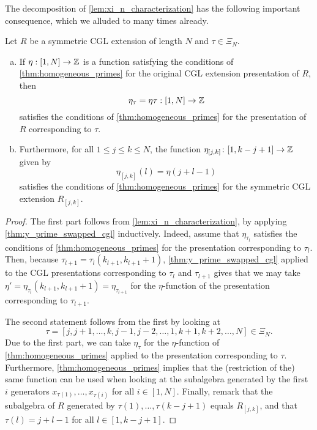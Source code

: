 The decomposition of \cref{lem:xi_n_characterization} has the following important
consequence, which we alluded to many times already.
\begin{proposition}\label{prop:eta_invariance}
	Let $R$ be a symmetric CGL extension of length $N$ and $\tau \in \Xi_N$.
	\begin{enumerate}[(a)]
		\item If $\eta : [1, N] \to \mathbb{Z}$ is a function satisfying the conditions of
		      \cref{thm:homogeneous_primes} for the original CGL extension presentation of $R$, then
		      \begin{equation*}
			      \eta_\tau = \eta \tau : [1, N] \to \mathbb{Z}
		      \end{equation*}
		      satisfies the conditions of \cref{thm:homogeneous_primes} for the presentation of $R$
		      corresponding to $\tau$.

		\item Furthermore, for all $1 \leq j \leq k \leq N$, the function $\eta_{[j, k]} \colon [1,
				      k-j+1] \to \mathbb{Z}$ given by
		      \begin{equation*}
			      \eta_{[j,k]}(l) = \eta(j+l-1)
		      \end{equation*}
		      satisfies the conditions of \cref{thm:homogeneous_primes} for the symmetric CGL
		      extension $R_{[j,k]}$.
	\end{enumerate}
\end{proposition}
\begin{proof}

	The first part follows from \cref{lem:xi_n_characterization}, by applying
	\cref{thm:y_prime_swapped_cgl} inductively. Indeed, assume that $\eta_{\tau_l}$
	satisfies the conditions of \cref{thm:homogeneous_primes} for the presentation
	corresponding to $\tau_l$. Then, because $\tau_{l+1} = \tau_l (k_{l+1}, k_{l+1} + 1)$,
	\cref{thm:y_prime_swapped_cgl} applied to the CGL presentations corresponding to
	$\tau_{l}$ and $\tau_{l+1}$ gives that we may take $\eta' = \eta_{\tau_l}(k_{l+1},
		k_{l+1}+1) = \eta_{\tau_{l+1}}$ for the $\eta$-function of the presentation
	corresponding to $\tau_{l+1}$.

	The second statement follows from the first by looking at
	\begin{equation*}
		\tau = [j, j+1, \dots, k, j-1,j-2, \dots , 1, k+1, k+2, \dots, N] \in \Xi_N.
	\end{equation*}
	Due to the first part, we can take $\eta_\tau$ for the $\eta$-function of
	\cref{thm:homogeneous_primes} applied to the presentation corresponding to $\tau$.
	Furthermore, \cref{thm:homogeneous_primes} implies that the (restriction of the) same
	function can be used when looking at the subalgebra generated by the first $i$
	generators $x_{\tau(1)}, \dots, x_{\tau(i)}$ for all $i \in [1, N]$. Finally, remark
	that the subalgebra of $R$ generated by $\tau(1), \dots, \tau(k - j + 1)$ equals
	$R_{[j, k]}$, and that $\tau(l) = j + l - 1$ for all $l \in [1, k- j + 1]$.
\end{proof}

